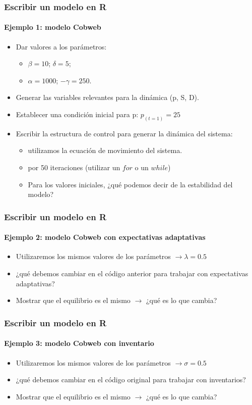 \documentclass[11pt]{beamer}
\begin{document}
\begin{frame}
	\frametitle{Escribir un modelo en R}
	\framesubtitle{Ejemplo 1: modelo Cobweb}
\begin{itemize}
	\item Dar valores a los parámetros:
	\begin{itemize}
		\item $\beta=10$; \hspace{0.55cm} $\delta=5$;
		\item $\alpha=1000$; $-\gamma=250$.
	\end{itemize}
	\item Generar las variables relevantes para la dinámica (p, S, D).
	\item Establecer una condición inicial para p: $p_{(t=1)}=25$
	\item Escribir la estructura de control para generar la dinámica del sistema:
	\begin{itemize}
		\item utilizamos la ecuación de movimiento del sistema.
		\item por 50 iteraciones (utilizar un $for$ o un $while$)
		\item Para los valores iniciales, ¿qué podemos decir de la estabilidad del modelo? \onslide<2->{Probar con:
			\begin{itemize}
				\item $\beta=\delta=10$
				\item $\beta=10$, $\delta=10.5$
			\end{itemize}}
	\end{itemize}
\end{itemize}
\end{frame}

\begin{frame}
	\frametitle{Escribir un modelo en R}
\framesubtitle{Ejemplo 2: modelo Cobweb con expectativas adaptativas}
\begin{itemize}
	\item Utilizaremos los mismos valores de los parámetros $\longrightarrow \lambda=0.5$  
	\item ¿qué debemos cambiar en el código anterior para trabajar con expectativas adaptativas?
	\item Mostrar que el equilibrio es el mismo $\longrightarrow$ ¿qué es lo que cambia?
\end{itemize}
\end{frame}

\begin{frame}
	\frametitle{Escribir un modelo en R}
	\framesubtitle{Ejemplo 3: modelo Cobweb con inventario}
	\begin{itemize}
		\item Utilizaremos los mismos valores de los parámetros $\longrightarrow \sigma=0.5$  
		\item ¿qué debemos cambiar en el código original para trabajar con inventarios?
		\item Mostrar que el equilibrio es el mismo $\longrightarrow$ ¿qué es lo que cambia?
	\end{itemize}
\end{frame}
\end{document}
